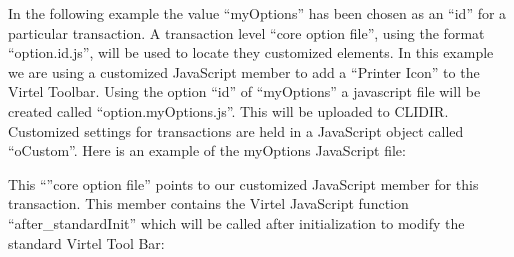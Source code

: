 \documentclass[letterpaper,10pt,english]{sphinxmanual}
\begin{document}
\sphinxAtStartPar
In the following example the value “myOptions” has been chosen as an “id” for a particular transaction. A transaction level “core option file”, using the format “option.id.js”, will be used to locate they customized elements. In this example we are using a customized JavaScript member to add a “Printer Icon” to the Virtel Toolbar. Using the option “id” of “myOptions” a javascript file will be created called “option.myOptions.js”. This will be uploaded to CLI\sphinxhyphen{}DIR. Customized settings for transactions are held in a JavaScript object called “oCustom”. Here is an example of the myOptions JavaScript file:

\begin{sphinxVerbatim}[commandchars=\\\{\}]
       
 
\end{sphinxVerbatim}

\sphinxAtStartPar
{}

\sphinxAtStartPar
This “”core option file” points to our customized JavaScript member for this transaction. This member contains the Virtel JavaScript function “after\_standardInit” which will be called after initialization to modify the standard Virtel Tool Bar:

\begin{sphinxVerbatim}[commandchars=\\\{\}]
  
    
  
     

  
  
\end{sphinxVerbatim}
\end{document}

